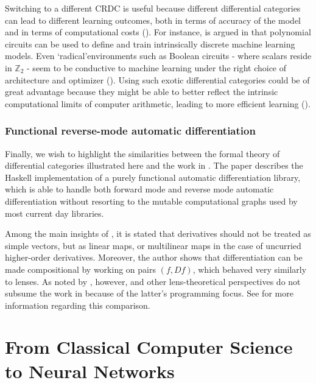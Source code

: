 \documentclass[11pt,a4paper,openright,twoside]{report}
\theoremstyle{plain}
\theoremstyle{definition}
\begin{document}
Switching to a different CRDC is useful because different differential categories can lead to different learning outcomes, both in terms of accuracy of the model and in terms of computational costs (\cite{wilson2022categories}).
For instance, is argued in \cite{wilson2022categories} that polynomial circuits can be used to define and train intrinsically discrete machine learning models. Even \lq radical\rq environments such as Boolean circuits - where scalars reside in $\mathbb{Z}_2$ - seem to be conductive to machine learning under the right choice of architecture and optimizer (\cite{wilson2021reverse}). Using such exotic differential categories could be of great advantage because they might be able to better reflect the intrinsic computational limits of computer arithmetic, leading to more efficient learning (\cite{wilson2022categories}). 

\subsection{Functional reverse-mode automatic differentiation}

Finally, we wish to highlight the similarities between the formal theory of differential categories illustrated here and the work in \cite{elliott2018simple}. The paper describes the Haskell implementation of a purely functional automatic differentiation library, which is able to handle both forward mode and reverse mode automatic differentiation without resorting to the mutable computational graphs used by most current day libraries. 

Among the main insights of \cite{elliott2018simple}, it is stated that derivatives should not be treated as simple vectors, but as linear maps, or multilinear maps in the case of uncurried higher-order derivatives. Moreover, the author shows that differentiation can be made compositional by working on pairs $(f, Df)$, which behaved very similarly to lenses. As noted by \cite{shiebler2021category}, however, \cite{cruttwell2022categorical} and other lens-theoretical perspectives do not subsume the work in \cite{elliott2018simple} because of the latter's programming focus. See \cite{shiebler2021category} for more information regarding this comparison.

\clearpage{\pagestyle{empty}\cleardoublepage}


\chapter{From Classical Computer Science to Neural Networks}
\lhead[\fancyplain{}{\bfseries\thepage}]{\fancyplain{}{\bfseries\rightmark}}
\end{document}
